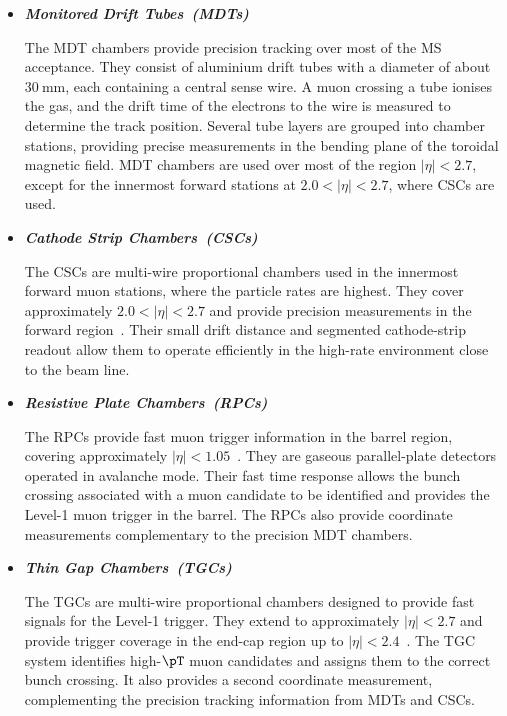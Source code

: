 \begin{itemize}
    \item \textbf{\textit{Monitored Drift Tubes~(MDTs)\quad}}

    The MDT chambers provide precision tracking over most of the MS acceptance.
    They consist of aluminium drift tubes with a diameter of about $30~\mathrm{mm}$, each containing a central sense wire.
    A muon crossing a tube ionises the gas, and the drift time of the electrons to the wire is measured to determine the track position.
    Several tube layers are grouped into chamber stations, providing precise measurements in the bending plane of the toroidal magnetic field.
    MDT chambers are used over most of the region $|\eta|<2.7$, except for the innermost forward stations at $2.0<|\eta|<2.7$, where CSCs are used.

    \item \textbf{\textit{Cathode Strip Chambers~(CSCs)\quad}}

    The CSCs are multi-wire proportional chambers used in the innermost forward muon stations, where the particle rates are highest.
    They cover approximately $2.0<|\eta|<2.7$ and provide precision measurements in the forward region~\cite{ATLASDetector2008}.
    Their small drift distance and segmented cathode-strip readout allow them to operate efficiently in the high-rate environment close to the beam line.

    \item \textbf{\textit{Resistive Plate Chambers~(RPCs)\quad}}

    The RPCs provide fast muon trigger information in the barrel region, covering approximately $|\eta|<1.05$~\cite{ATLASDetector2008}.
    They are gaseous parallel-plate detectors operated in avalanche mode.
    Their fast time response allows the bunch crossing associated with a muon candidate to be identified and provides the Level-1 muon trigger in the barrel.
    The RPCs also provide coordinate measurements complementary to the precision MDT chambers.

    \item \textbf{\textit{Thin Gap Chambers~(TGCs)\quad}}

    The TGCs are multi-wire proportional chambers designed to provide fast signals for the Level-1 trigger.
    They extend to approximately $|\eta|<2.7$ and provide trigger coverage in the end-cap region up to $|\eta|<2.4$~\cite{ATLASDetector2008}.
    The TGC system identifies high-$\pT$ muon candidates and assigns them to the correct bunch crossing.
    It also provides a second coordinate measurement, complementing the precision tracking information from MDTs and CSCs.
\end{itemize}

